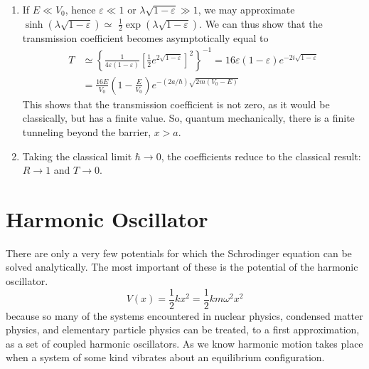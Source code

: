 \begin{enumerate}
	\item  If $E \ll V_{0}$, hence $\varepsilon \ll 1$ or $\lambda \sqrt{1-\varepsilon} \gg 1$, we may approximate $\sinh (\lambda \sqrt{1-\varepsilon}) \simeq$ $\frac{1}{2} \exp (\lambda \sqrt{1-\varepsilon})$. We can thus show that the transmission coefficient becomes asymptotically equal to
	$$
	\begin{aligned}
	T & \simeq\left\{\frac{1}{4 \varepsilon(1-\varepsilon)}\left[\frac{1}{2} e^{2 \sqrt{1-\varepsilon}}\right]^{2}\right\}^{-1}=16 \varepsilon(1-\varepsilon) e^{-2 i \sqrt{1-\varepsilon}} \\
	&=\frac{16 E}{V_{0}}\left(1-\frac{E}{V_{0}}\right) e^{-(2 a / \hbar) \sqrt{2 m\left(V_{0}-E\right)}}
	\end{aligned}
	$$
	This shows that the transmission coefficient is not zero, as it would be classically, but has a finite value. So, quantum mechanically, there is a finite tunneling beyond the barrier, $x>a$.
	\item Taking the classical limit $\hbar \rightarrow 0$, the coefficients reduce to the classical result: $R \rightarrow 1$ and $T \rightarrow 0$.
\end{enumerate}














































\section{Harmonic Oscillator}
There are only a very few potentials for which the Schrodinger equation can be solved analytically. The most important of these is the potential of the harmonic oscillator.
$$
V(x)=\frac{1}{2} kx^{2}=\frac{1}{2} km\omega^{2}x^{2}
$$
because so many of the systems encountered in nuclear physics, condensed matter physics, and elementary particle physics can be treated, to a first approximation, as a set of coupled harmonic oscillators. As we know harmonic motion takes place when a system of some kind vibrates about an equilibrium configuration.
